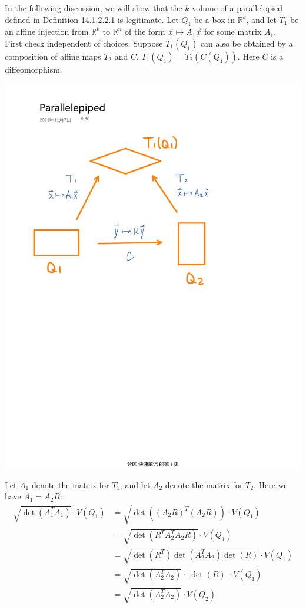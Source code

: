 \documentclass[11pt,oneside]{book}
\theoremstyle{break}
\theoremstyle{break}
\newcommand{\R}{\mathbb{R}}
\begin{document}
In the following discussion, we will show that the $k$-volume of a parallelopied defined in Definition 14.1.2.2.1 is legitimate. Let $Q_1$ be a box in $\R^k$, and let $T_1$ be an affine injection from $\R^k$ to $\R^n$ of the form $\vec{x}\mapsto A_1\vec{x}$ for some matrix $A_1$.\\

First check independent of choices. Suppose $T_1(Q_1)$ can also be obtained by a composition of affine maps $T_2$ and $C$, $T_1(Q_1) = T_2(C(Q_1))$. Here $C$ is a diffeomorphism. \\
\begin{center}
\includegraphics[scale=0.5]{parallpied.pdf}
\end{center}
Let $A_1$ denote the matrix for $T_1$, and let $A_2$ denote the matrix for $T_2$. Here we have $A_1 = A_2 R$:
\begin{align*}
\sqrt{\det(A_1^TA_1)} \cdot V(Q_1) &= \sqrt{\det((A_2R)^T(A_2R))} \cdot V(Q_1) \\&= \sqrt{\det(R^TA_2^TA_2R)} \cdot V(Q_1) \\&= \sqrt{\det(R^T)\det(A_2^TA_2)\det(R)}\cdot V(Q_1) \\&= \sqrt{\det(A_2^TA_2)}\cdot |\det(R)|\cdot V(Q_1) \\&= \sqrt{\det(A_2^TA_2)}\cdot V(Q_2)
\end{align*}
\end{document}
